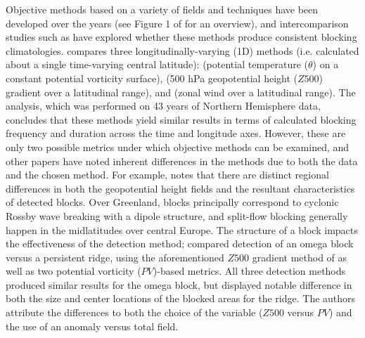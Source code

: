 \documentclass[smallextended]{svjour3}       %
\numberwithin{equation}{section}
\begin{document}
Objective methods based on a variety of fields and techniques have been developed over the years (see Figure 1 of \cite{barriopedro_application_2010} for an overview), and intercomparison studies such as \cite{barnes_methodology_2012} have explored whether these methods produce consistent blocking climatologies. \cite{barnes_methodology_2012} compares three longitudinally-varying (1D) methods (i.e. calculated about a single time-varying central latitude): \citealt{pelly_new_2003} (potential temperature ($\theta$) on a constant potential vorticity surface), \citealt{tibaldi_operational_1990} (500 hPa geopotential height ($Z500$) gradient over a latitudinal range), and \citealt{scaife_atmospheric_2010} (zonal wind over a latitudinal range). The analysis, which was performed on 43 years of Northern Hemisphere data, concludes that these methods yield similar results in terms of calculated blocking frequency and duration across the time and longitude axes. However, these are only two possible metrics under which objective methods can be examined, and other papers have noted inherent differences in the methods due to both the data and the chosen method. For example, \cite{davini_bidimensional_2012} notes that there are distinct regional differences in both the geopotential height fields and the resultant characteristics of detected blocks. Over Greenland, blocks principally correspond to cyclonic Rossby wave breaking with a dipole structure, and split-flow blocking generally happen in the midlatitudes over central Europe. The structure of a block impacts the effectiveness of the detection method; \cite{scherrer_two-dimensional_2006} compared detection of an omega block versus a persistent ridge, using the aforementioned $Z500$ gradient method of \cite{tibaldi_operational_1990} as well as two potential vorticity ($PV$)-based metrics. All three detection methods produced similar results for the omega block, but displayed notable difference in both the size and center locations of the blocked areas for the ridge. The authors attribute the differences to both the choice of the variable ($Z500$ versus $PV$) and the use of an anomaly versus total field. 
\end{document}
